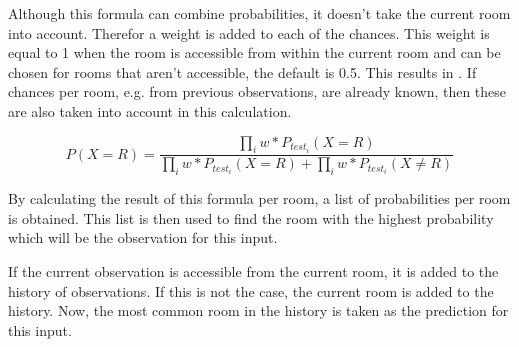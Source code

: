 Although this formula can combine probabilities, it doesn't take the current room into account. Therefor a weight is added to each of the chances. This weight is equal to 1 when the room is accessible from within the current room and can be chosen for rooms that aren't accessible, the default is 0.5. This results in . If chances per room, e.g. from previous observations, are already known, then these are also taken into account in this calculation.

\begin{equation}
    \label{eq:combine-chances-next-level}
    P(X = R) = \frac{\prod_{i} w * P_{test_i}(X = R)}{\prod_{i} w * P_{test_i}(X = R) + \prod_{i} w * P_{test_i}(X \ne R)}
\end{equation}

By calculating the result of this formula per room, a list of probabilities per room is obtained. This list is then used to find the room with the highest probability which will be the observation for this input.

If the current observation is accessible from the current room, it is added to the history of observations. If this is not the case, the current room is added to the history. Now, the most common room in the history is taken as the prediction for this input.
